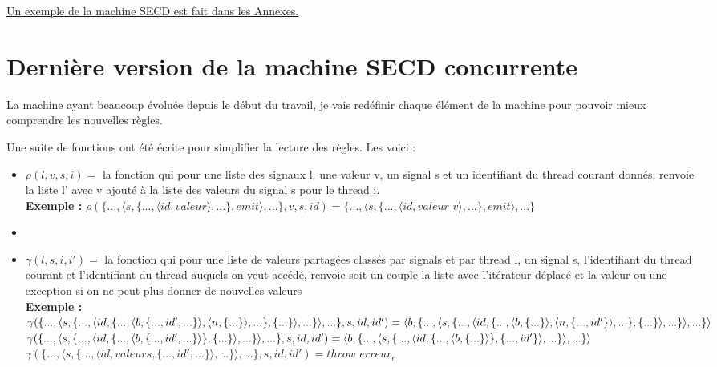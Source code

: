 \documentclass[10pt,a4paper]{article}
\begin{document}
					
					\hyperref[SECD]{Un exemple de la machine SECD est fait dans les Annexes.}
					
					\newpage
		\section{Dernière version de la machine SECD concurrente}\label{SECDConc4}
			La machine ayant beaucoup évoluée depuis le début du travail, je vais redéfinir chaque élément de la machine pour pouvoir mieux comprendre les nouvelles règles.
			\bigbreak
			
			Une suite de fonctions ont été écrite pour simplifier la lecture des règles. Les voici :
			\begin{itemize}
				\item[] $\rho(l,v,s,i) =$ la fonction qui pour une liste des signaux l, une valeur v, un signal s et un identifiant du thread courant donnés, renvoie la liste l' avec v ajouté à la liste des valeurs du signal s pour le thread i.
				\\\textbf{Exemple :} $\rho(\{...,\langle s,\{...,\langle id,valeur\rangle,...\},emit\rangle,...\},v,s,id) = \{...,\langle s,\{...,\langle id,valeur$ $v\rangle,...\},emit\rangle,...\}$
				\item[] 
				\item[] $\gamma(l,s,i,i') =$ la fonction qui pour une liste de valeurs partagées classés par signals et par thread l, un signal s, l'identifiant du thread courant et l'identifiant du thread auquels on veut accédé, renvoie soit un couple la liste avec l'itérateur déplacé et la valeur ou une exception si on ne peut plus donner de nouvelles valeurs 
				\\\textbf{Exemple :}
				\\$\gamma(\{...,\langle s,\{...,\langle id,\{...,\langle b,\{...,id',...\}\rangle,\langle n,\{...\}\rangle,...\},\{...\}\rangle,...\}\rangle,...\},s,id,id') = 
				\\\langle b , \{...,\langle s,\{...,\langle id,\{...,\langle b,\{...\}\rangle,\langle n,\{...,id'\}\rangle,...\},\{...\}\rangle,...\}\rangle,...\} \rangle$
				\medbreak
				$\gamma(\{...,\langle s,\{...,\langle id,\{...,\langle b,\{...,id',...\}\rangle\},\{...\}\rangle,...\}\rangle,...\},s,id,id') = 
				\\\langle b , \{...,\langle s,\{...,\langle id,\{...,\langle b,\{...\}\rangle\},\{...,id'\}\rangle,...\}\rangle,...\} \rangle$
				\medbreak
				$\gamma(\{...,\langle s,\{...,\langle id,valeurs,\{...,id',...\}\rangle,...\}\rangle,...\},s,id,id') = throw$ $erreur_{e}$

\end{itemize}
\end{document}

